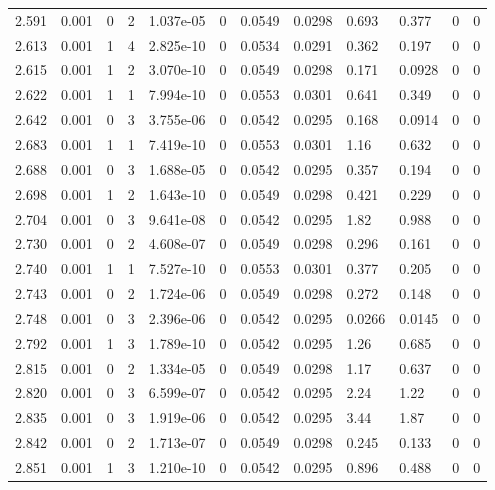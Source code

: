 \documentclass[preview]{standalone}
\begin{document}
{{{{{\begin{tabular}{L{1.2cm}C{1.2cm} C{0.3cm}C{0.5cm} C{1.4cm}C{1.4cm} C{1.4cm}C{1.4cm} C{1.6cm}C{1.6cm} C{1.6cm}C{1.6cm}}
  2.591  &  0.001  & 0     &  2 &  1.037e-05  & 0  &  0.0549&   0.0298& 0.693 & 0.377   &  0 & 0  \\ 
  2.613  &  0.001  & 1     &  4 &  2.825e-10  & 0  &  0.0534&   0.0291& 0.362 & 0.197   &  0 & 0  \\ 
  2.615  &  0.001  & 1     &  2 &  3.070e-10  & 0  &  0.0549&   0.0298& 0.171 & 0.0928   &  0 & 0  \\ 
  2.622  &  0.001  & 1     &  1 &  7.994e-10  & 0  &  0.0553&   0.0301& 0.641 & 0.349   &  0 & 0  \\ 
  2.642  &  0.001  & 0     &  3 &  3.755e-06  & 0  &  0.0542&   0.0295& 0.168 & 0.0914   &  0 & 0  \\ 
  2.683  &  0.001  & 1     &  1 &  7.419e-10  & 0  &  0.0553&   0.0301& 1.16 & 0.632   &  0 & 0  \\ 
  2.688  &  0.001  & 0     &  3 &  1.688e-05  & 0  &  0.0542&   0.0295& 0.357 & 0.194   &  0 & 0  \\ 
  2.698  &  0.001  & 1     &  2 &  1.643e-10  & 0  &  0.0549&   0.0298& 0.421 & 0.229   &  0 & 0  \\ 
  2.704  &  0.001  & 0     &  3 &  9.641e-08  & 0  &  0.0542&   0.0295& 1.82 & 0.988   &  0 & 0  \\ 
  2.730  &  0.001  & 0     &  2 &  4.608e-07  & 0  &  0.0549&   0.0298& 0.296 & 0.161   &  0 & 0  \\ 
  2.740  &  0.001  & 1     &  1 &  7.527e-10  & 0  &  0.0553&   0.0301& 0.377 & 0.205   &  0 & 0  \\ 
  2.743  &  0.001  & 0     &  2 &  1.724e-06  & 0  &  0.0549&   0.0298& 0.272 & 0.148   &  0 & 0  \\ 
  2.748  &  0.001  & 0     &  3 &  2.396e-06  & 0  &  0.0542&   0.0295& 0.0266 & 0.0145   &  0 & 0  \\ 
  2.792  &  0.001  & 1     &  3 &  1.789e-10  & 0  &  0.0542&   0.0295& 1.26 & 0.685   &  0 & 0  \\ 
  2.815  &  0.001  & 0     &  2 &  1.334e-05  & 0  &  0.0549&   0.0298& 1.17 & 0.637   &  0 & 0  \\ 
  2.820  &  0.001  & 0     &  3 &  6.599e-07  & 0  &  0.0542&   0.0295& 2.24 & 1.22   &  0 & 0  \\ 
  2.835  &  0.001  & 0     &  3 &  1.919e-06  & 0  &  0.0542&   0.0295& 3.44 & 1.87   &  0 & 0  \\ 
  2.842  &  0.001  & 0     &  2 &  1.713e-07  & 0  &  0.0549&   0.0298& 0.245 & 0.133   &  0 & 0  \\ 
  2.851  &  0.001  & 1     &  3 &  1.210e-10  & 0  &  0.0542&   0.0295& 0.896 & 0.488   &  0 & 0  \\ 

\end{tabular}}}}}}
\end{document}
